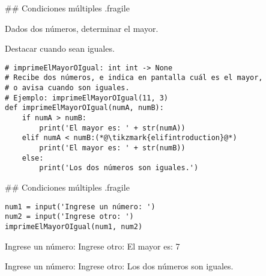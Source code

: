 ## Condiciones múltiples {.fragile}



\bgnblockgood[wd=.8\textwidth]

Dados dos números, determinar el mayor.

\alert{Destacar cuando sean iguales.}

\trmblockgood

\begin{lstlisting}[style=frame02]
# imprimeElMayorOIgual: int int -> None
# Recibe dos números, e indica en pantalla cuál es el mayor,
# o avisa cuando son iguales.
# Ejemplo: imprimeElMayorOIgual(11, 3)
def imprimeElMayorOIgual(numA, numB):
    if numA > numB:
        print('El mayor es: ' + str(numA))
    elif numA < numB:(*@\tikzmark{elifintroduction}@*)
        print('El mayor es: ' + str(numB))
    else:
        print('Los dos números son iguales.')
\end{lstlisting}

\vspace{-3ex}

## Condiciones múltiples {.fragile}


\bgncolumns
{}
\vspace{-1ex}


\begin{lstlisting}
num1 = input('Ingrese un número: ')
num2 = input('Ingrese otro: ')
imprimeElMayorOIgual(num1, num2)
\end{lstlisting}

\vspace{-1ex}


\begin{exampleConsole}
Ingrese un número: 
Ingrese otro: 
El mayor es: 7
\end{exampleConsole}

\fullrule


\begin{exampleConsole}
Ingrese un número: 
Ingrese otro: 
Los dos números son iguales.
\end{exampleConsole}

